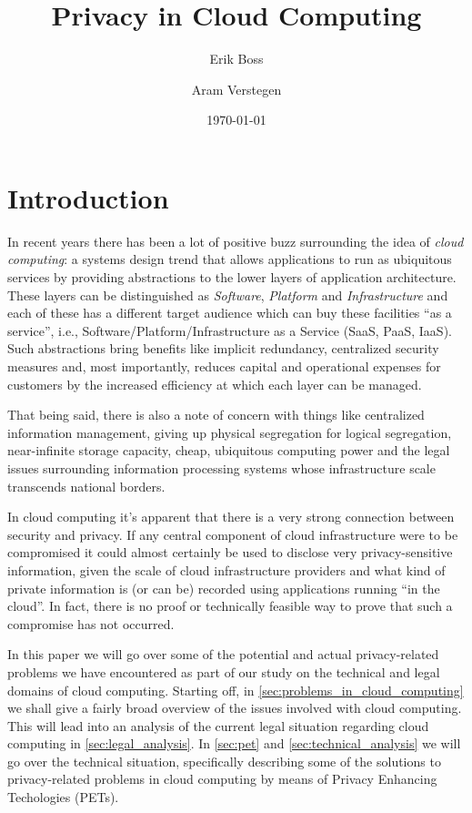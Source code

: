 \documentclass[12pt]{article}
\begin{document}
\title{Privacy in Cloud Computing}

\author{Erik Boss \and Aram Verstegen}
\date{\today}
\maketitle


\section{Introduction}
In recent years there has been a lot of positive buzz surrounding the idea of \textit{cloud computing}: a systems design trend that allows applications to run as ubiquitous services by providing abstractions to the lower layers of application architecture.
These layers can be distinguished as \textit{Software}, \textit{Platform} and \textit{Infrastructure} and each of these has a different target audience which can buy these facilities ``as a service'', i.e., Software/Platform/Infrastructure as a Service (SaaS, PaaS, IaaS). 
Such abstractions bring benefits like implicit redundancy, centralized security measures and, most importantly, reduces capital and operational expenses for customers by the increased efficiency at which each layer can be managed.

That being said, there is also a note of concern with things like centralized information management, giving up physical segregation for logical segregation, near-infinite storage capacity, cheap, ubiquitous computing power and the legal issues surrounding information processing systems whose infrastructure scale transcends national borders.

In cloud computing it's apparent that there is a very strong connection between security and privacy.
If any central component of cloud infrastructure were to be compromised it could almost certainly be used to disclose very privacy-sensitive information, given the scale of cloud infrastructure providers and what kind of private information is (or can be) recorded using applications running ``in the cloud''. In fact, there is no proof or technically feasible way to prove that such a compromise has not occurred.

In this paper we will go over some of the potential and actual privacy-related problems we have encountered as part of our study on the technical and legal domains of cloud computing. Starting off, in \autoref{sec:problems_in_cloud_computing} we shall give a fairly broad overview of the issues involved with cloud computing.
This will lead into an analysis of the current legal situation regarding cloud computing in \autoref{sec:legal_analysis}. In \autoref{sec:pet} and \autoref{sec:technical_analysis} we will go over the technical situation, specifically describing some of the solutions to privacy-related problems in cloud computing by means of Privacy Enhancing Techologies (PETs).
\end{document}
